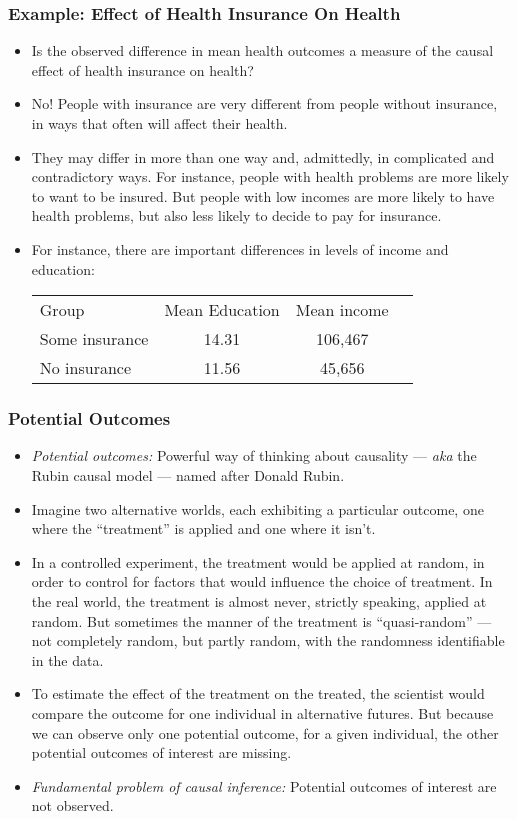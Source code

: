\begin{frame}
\frametitle{Example: Effect of Health Insurance On Health}
\begin{itemize}
\item Is the observed difference in mean health outcomes a measure of the causal effect of health insurance on health?
\item No! People with insurance are very different from people without insurance, in ways that often will affect their health.
\item They may differ in more than one way and, admittedly, in complicated and contradictory ways. For instance, people with health problems are more likely to want to be insured. But people with low incomes are more likely to have health problems, but also less likely to decide to pay for insurance.
\item For instance, there are important differences in levels of income and education:
\begin{center}\medskip
\begin{tabular}{lccc} 
\toprule
Group &  Mean Education & Mean income \\
Some insurance & 14.31 & 106,467  \\
No insurance & 11.56 &  45,656 \\ 
\bottomrule
\end{tabular}
\end{center}
\end{itemize}
\end{frame}


\begin{frame}
\frametitle{Potential Outcomes}
\begin{itemize}
\item \emph{Potential outcomes:} Powerful way of thinking about causality --- \textit{aka} the Rubin causal model --- named after Donald Rubin.
\item Imagine two alternative worlds, each exhibiting a particular outcome, one where the ``treatment'' is applied and one where it isn't. 
\item In a controlled experiment, the treatment would be applied at random, in order to control for factors that would influence the choice of treatment. In the real world, the treatment is almost never, strictly speaking, applied at random. But sometimes the manner of the treatment is ``quasi-random'' --- not completely random, but partly random, with the randomness identifiable in the data. 
\item To estimate the effect of the treatment on the treated, the scientist would compare the outcome for one individual in alternative futures. But because we can observe only one potential outcome, for a given individual, the other potential outcomes of interest are missing. 
\item \emph{Fundamental problem of causal inference:} Potential outcomes of interest are not observed. 
\end{itemize}
\end{frame}


